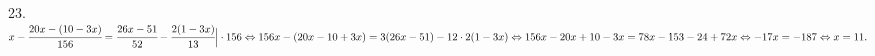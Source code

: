 23. $x-\cfrac{20x-(10-3x)}{156}=\cfrac{26x-51}{52}-\cfrac{2(1-3x)}{13}\Big|\cdot156\Leftrightarrow
156x-(20x-10+3x)=3(26x-51)-12\cdot2(1-3x)\Leftrightarrow
156x-20x+10-3x=78x-153-24+72x\Leftrightarrow
-17x=-187\Leftrightarrow x=11.$\\
